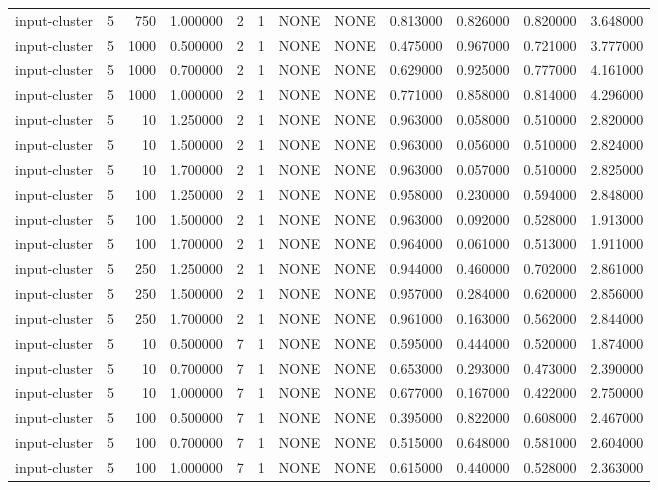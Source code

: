 \begin{tabular}{lrrrllllrrrr}
input-cluster & 5 & 750 & 1.000000 & 2 & 1 & NONE & NONE & 0.813000 & 0.826000 & 0.820000 & 3.648000 \\
input-cluster & 5 & 1000 & 0.500000 & 2 & 1 & NONE & NONE & 0.475000 & 0.967000 & 0.721000 & 3.777000 \\
input-cluster & 5 & 1000 & 0.700000 & 2 & 1 & NONE & NONE & 0.629000 & 0.925000 & 0.777000 & 4.161000 \\
input-cluster & 5 & 1000 & 1.000000 & 2 & 1 & NONE & NONE & 0.771000 & 0.858000 & 0.814000 & 4.296000 \\
input-cluster & 5 & 10 & 1.250000 & 2 & 1 & NONE & NONE & 0.963000 & 0.058000 & 0.510000 & 2.820000 \\
input-cluster & 5 & 10 & 1.500000 & 2 & 1 & NONE & NONE & 0.963000 & 0.056000 & 0.510000 & 2.824000 \\
input-cluster & 5 & 10 & 1.700000 & 2 & 1 & NONE & NONE & 0.963000 & 0.057000 & 0.510000 & 2.825000 \\
input-cluster & 5 & 100 & 1.250000 & 2 & 1 & NONE & NONE & 0.958000 & 0.230000 & 0.594000 & 2.848000 \\
input-cluster & 5 & 100 & 1.500000 & 2 & 1 & NONE & NONE & 0.963000 & 0.092000 & 0.528000 & 1.913000 \\
input-cluster & 5 & 100 & 1.700000 & 2 & 1 & NONE & NONE & 0.964000 & 0.061000 & 0.513000 & 1.911000 \\
input-cluster & 5 & 250 & 1.250000 & 2 & 1 & NONE & NONE & 0.944000 & 0.460000 & 0.702000 & 2.861000 \\
input-cluster & 5 & 250 & 1.500000 & 2 & 1 & NONE & NONE & 0.957000 & 0.284000 & 0.620000 & 2.856000 \\
input-cluster & 5 & 250 & 1.700000 & 2 & 1 & NONE & NONE & 0.961000 & 0.163000 & 0.562000 & 2.844000 \\
input-cluster & 5 & 10 & 0.500000 & 7 & 1 & NONE & NONE & 0.595000 & 0.444000 & 0.520000 & 1.874000 \\
input-cluster & 5 & 10 & 0.700000 & 7 & 1 & NONE & NONE & 0.653000 & 0.293000 & 0.473000 & 2.390000 \\
input-cluster & 5 & 10 & 1.000000 & 7 & 1 & NONE & NONE & 0.677000 & 0.167000 & 0.422000 & 2.750000 \\
input-cluster & 5 & 100 & 0.500000 & 7 & 1 & NONE & NONE & 0.395000 & 0.822000 & 0.608000 & 2.467000 \\
input-cluster & 5 & 100 & 0.700000 & 7 & 1 & NONE & NONE & 0.515000 & 0.648000 & 0.581000 & 2.604000 \\
input-cluster & 5 & 100 & 1.000000 & 7 & 1 & NONE & NONE & 0.615000 & 0.440000 & 0.528000 & 2.363000 \\

\end{tabular}
